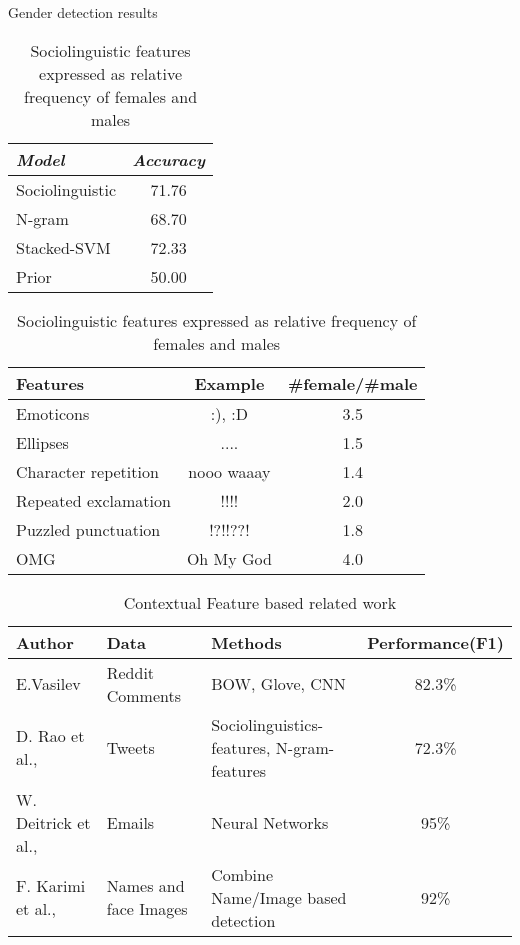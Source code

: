 \documentclass[runningheads]{llncs}
\begin{document}
	\begin{table}[!htb]
		\begin{minipage}{.5\linewidth}
			\caption{Gender detection results \cite{rao2010classifying}}
			\centering
			\begin{tabular}{| l | c |}
				\hline
				\textit{Model} & \textit{Accuracy} \\
				\hline
				Sociolinguistic & 71.76\\
				N-gram &  68.70\\
				Stacked-SVM & 72.33 \\
				Prior & 50.00 \\
				\hline
			\end{tabular}
			\label{table:text_results}
		\end{minipage}%
		\begin{minipage}{.5\linewidth}
			\centering
			\caption{Sociolinguistic features expressed as relative frequency of females and males \cite{rao2010classifying}}
			\begin{tabular}{| l | c | c |}
				\hline
				Features &  Example & \#female/\#male\\
				\hline
				Emoticons &  :), :D & 3.5\\
				Ellipses &  ....  & 1.5\\
				Character repetition & nooo waaay & 1.4\\
				Repeated exclamation & !!!!  &  2.0 \\
				Puzzled punctuation & !?!!??! & 1.8\\
				OMG & Oh My God & 4.0\\
				\hline
			\end{tabular}
			\label{table:frequency}
		\end{minipage} 
	\end{table}

	\begin{table}
		\caption{Contextual Feature based related work }
		\begin{tabular}{| l | l | l | c | }
			\hline
			Author  &  Data  & Methods & Performance(F1)\\
			\hline
			E.Vasilev \cite{Vasilev:Thesis:2018}
 &  Reddit Comments & BOW, Glove, CNN
& 82.3\%\\
			D. Rao et al., \cite{rao2010classifying} &  Tweets  & Sociolinguistics-features, N-gram-features & 72.3\%\\
			W. Deitrick et al., \cite{deitrick2012author} & Emails & Neural Networks & 95\%\\
			F. Karimi et al., \cite{karimi2016inferring} & Names and face Images  & Combine Name/Image based detection &  92\%\\
			\hline
		\end{tabular}
		\label{table:contextual_work}
	\end{table}
\end{document}
